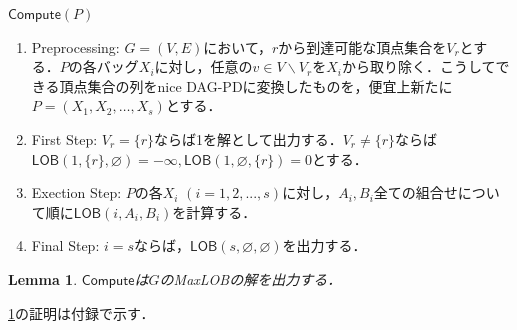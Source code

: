 \documentclass[master]{kuisthesis}		%
\theoremstyle{plain}
\newtheorem{lemma}{Lemma}
\theoremstyle{definition}
\begin{document}

$\mathsf{Compute}(P)$

\begin{enumerate}
    \item Preprocessing: $G=(V, E)$において，$r$から到達可能な頂点集合を$V_r$とする．$P$の各バッグ$X_i$に対し，任意の$v \in V \backslash V_r$を$X_i$から取り除く．こうしてできる頂点集合の列をnice DAG-PDに変換したものを，便宜上新たに$P = (X_1, X_2, \dots , X_s)$とする．
    \item First Step: $V_r = \{r\}$ならば1を解として出力する．$V_r \neq \{r\}$ならば$\mathsf{LOB}(1, \{r\}, \varnothing) = -\infty, \mathsf{LOB}(1, \varnothing, \{r\}) = 0$とする．
    \item Exection Step: $P$の各$X_i$ $(i=1, 2, ..., s)$に対し，$A_i, B_i$全ての組合せについて順に$\mathsf{LOB}(i, A_i, B_i)$を計算する．
    \item Final Step: $i = s$ならば，$\mathsf{LOB}(s, \varnothing, \varnothing)$を出力する．
\end{enumerate}


\begin{lemma}\label{lob}
    $\mathsf{Compute}$は$G$のMaxLOBの解を出力する．
\end{lemma}

\ref{lob}の証明は付録で示す．
\end{document}
